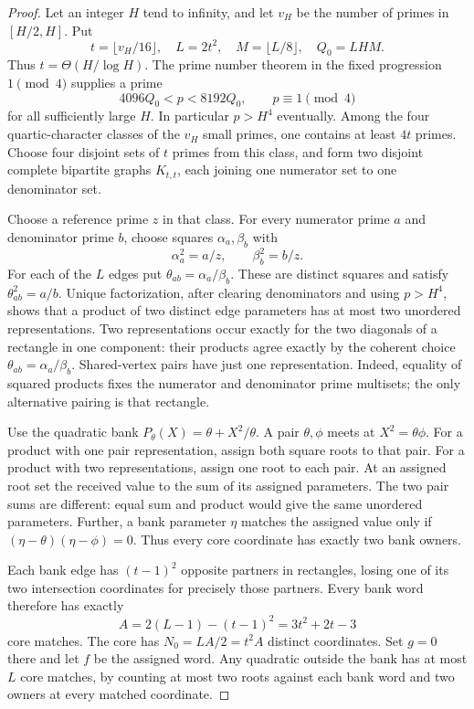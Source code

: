 \begin{proof}
Let an integer $H$ tend to infinity, and let $v_H$ be the number of
primes in $[H/2,H]$.  Put
\[
 t=\lfloor v_H/16\rfloor,\quad L=2t^2,\quad
 M=\lfloor L/8\rfloor,\quad Q_0=LHM.
\]
Thus $t=\Theta(H/\log H)$.  The prime number theorem in the fixed
progression $1\pmod4$ supplies a prime
\[
 4096Q_0<p<8192Q_0,\qquad p\equiv1\pmod4
\]
for all sufficiently large $H$.  In particular $p>H^4$ eventually.
Among the four quartic-character classes of the $v_H$ small primes,
one contains at least $4t$ primes.  Choose four disjoint sets of $t$
primes from this class, and form two disjoint complete bipartite graphs
$K_{t,t}$, each joining one numerator set to one denominator set.

Choose a reference prime $z$ in that class.  For every numerator prime
$a$ and denominator prime $b$, choose squares $\alpha_a,\beta_b$ with
\[
 \alpha_a^2=a/z,\qquad \beta_b^2=b/z.
\]
For each of the $L$ edges put $\theta_{ab}=\alpha_a/\beta_b$.
These are distinct squares and satisfy $\theta_{ab}^2=a/b$.
Unique factorization, after clearing denominators and using $p>H^4$,
shows that a product of two distinct edge parameters has at most two
unordered representations.  Two representations occur exactly for
the two diagonals of a rectangle in one component: their products agree
exactly by the coherent choice $\theta_{ab}=\alpha_a/\beta_b$.
Shared-vertex pairs have just one representation.  Indeed, equality
of squared products fixes the numerator and denominator prime
multisets; the only alternative pairing is that rectangle.

Use the quadratic bank $P_\theta(X)=\theta+X^2/\theta$.
A pair $\theta,\phi$ meets at $X^2=\theta\phi$.
For a product with one pair representation, assign both square roots
to that pair.  For a product with two representations, assign one
root to each pair.  At an assigned root set the received value to the
sum of its assigned parameters.  The two pair sums are different:
equal sum and product would give the same unordered parameters.
Further, a bank parameter $\eta$ matches the assigned value only if
$(\eta-\theta)(\eta-\phi)=0$.  Thus every core coordinate has exactly
two bank owners.

Each bank edge has $(t-1)^2$ opposite partners in rectangles, losing
one of its two intersection coordinates for precisely those partners.
Every bank word therefore has exactly
\[
 A=2(L-1)-(t-1)^2=3t^2+2t-3
\]
core matches.  The core has $N_0=LA/2=t^2A$ distinct coordinates.
Set $g=0$ there and let $f$ be the assigned word.
Any quadratic outside the bank has at most $L$ core matches, by
counting at most two roots against each bank word and two owners at
every matched coordinate.


\end{proof}
